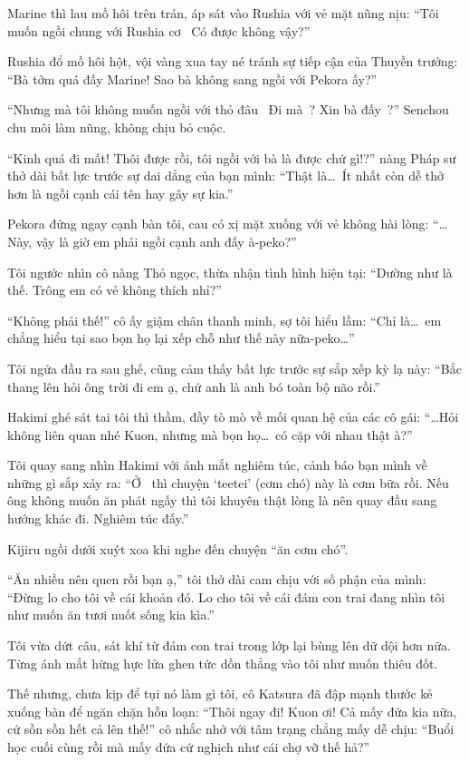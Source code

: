\documentclass[../main.tex]{subfiles}
\begin{document}
Marine thì lau mồ hôi trên trán, áp sát vào Rushia với vẻ mặt nũng nịu: ``Tôi muốn ngồi chung với Rushia cơ~ Có được không vậy?''

Rushia đổ mồ hôi hột, vội vàng xua tay né tránh sự tiếp cận của Thuyền trưởng: ``Bà tởm quá đấy Marine! Sao bà không sang ngồi với Pekora ấy?''

``Nhưng mà tôi không muốn ngồi với thỏ đâu~ Đi mà~? Xin bà đấy~?'' Senchou chu môi làm nũng, không chịu bỏ cuộc.

``Kinh quá đi mất! Thôi được rồi, tôi ngồi với bà là được chứ gì!?'' nàng Pháp sư thở dài bất lực trước sự dai dẳng của bạn mình: ``Thật là\dots\ Ít nhất còn dễ thở hơn là ngồi cạnh cái tên hay gây sự kia.''

Pekora đứng ngay cạnh bàn tôi, cau có xị mặt xuống với vẻ không hài lòng: ``\dots Này, vậy là giờ em phải ngồi cạnh anh đấy à-peko?''

Tôi ngước nhìn cô nàng Thỏ ngọc, thừa nhận tình hình hiện tại: ``Dường như là thế. Trông em có vẻ không thích nhỉ?''

``Không phải thế!'' cô ấy giậm chân thanh minh, sợ tôi hiểu lầm: ``Chỉ là\dots\ em chẳng hiểu tại sao bọn họ lại xếp chỗ như thế này nữa-peko\dots''

Tôi ngửa đầu ra sau ghế, cũng cảm thấy bất lực trước sự sắp xếp kỳ lạ này: ``Bắc thang lên hỏi ông trời đi em ạ, chứ anh là anh bó toàn bộ não rồi.''

Hakimi ghé sát tai tôi thì thầm, đầy tò mò về mối quan hệ của các cô gái: ``\dots Hỏi không liên quan nhé Kuon, nhưng mà bọn họ\dots\ có cặp với nhau thật à?''

Tôi quay sang nhìn Hakimi với ánh mắt nghiêm túc, cảnh báo bạn mình về những gì sắp xảy ra: ``Ở \hll\ thì chuyện `teetei' (cơm chó) này là cơm bữa rồi. Nếu ông không muốn ăn phát ngấy thì tôi khuyên thật lòng là nên quay đầu sang hướng khác đi. Nghiêm túc đấy.''

Kijiru ngồi dưới xuýt xoa khi nghe đến chuyện ``ăn cơm chó''.

``Ăn nhiều nên quen rồi bạn ạ,'' tôi thở dài cam chịu với số phận của mình: ``Đừng lo cho tôi về cái khoản đó. Lo cho tôi về cái đám con trai đang nhìn tôi như muốn ăn tươi nuốt sống kia kìa.''

Tôi vừa dứt câu, sát khí từ đám con trai trong lớp lại bùng lên dữ dội hơn nữa. Từng ánh mắt hừng hực lửa ghen tức dồn thẳng vào tôi như muốn thiêu đốt.

Thế nhưng, chưa kịp để tụi nó làm gì tôi, cô Katsura đã đập mạnh thước kẻ xuống bàn để ngăn chặn hỗn loạn: ``Thôi ngay đi! Kuon ơi! Cả mấy đứa kia nữa, cứ sồn sồn hết cả lên thế!'' cô nhắc nhở với tâm trạng chẳng mấy dễ chịu: ``Buổi học cuối cùng rồi mà mấy đứa cứ nghịch như cái chợ vỡ thế hả?''
\end{document}
